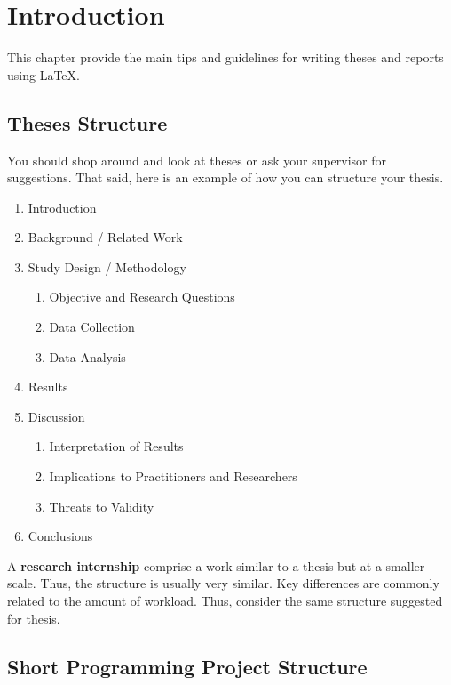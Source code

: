 \chapter{Introduction}
\label{chap:introduction}

This chapter provide the main tips and guidelines for writing theses and reports using \LaTeX.

\section{Theses Structure}
\label{sec:c1:thesesguidelines}

You should shop around and look at theses or ask your supervisor for suggestions.
That said, here is an example of how you can structure your thesis.

\begin{enumerate}
    \item Introduction
    \item Background / Related Work
    \item Study Design / Methodology
    \begin{enumerate}
        \item Objective and Research Questions
        \item Data Collection
        \item Data Analysis
    \end{enumerate}
    \item Results
    \item Discussion
    \begin{enumerate}
        \item Interpretation of Results
        \item Implications to Practitioners and Researchers
        \item Threats to Validity
    \end{enumerate}
    \item Conclusions
\end{enumerate}

A \textbf{research internship} comprise a work similar to a thesis but at a smaller scale. Thus, the structure is usually very similar. Key differences are commonly related to the amount of workload. Thus, consider the same structure suggested for thesis.

\section{Short Programming Project Structure}
\label{sec:c1:sppguidelines}

